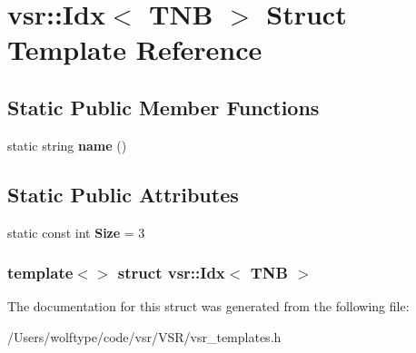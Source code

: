 \hypertarget{structvsr_1_1_idx_3_01_t_n_b_01_4}{\section{vsr\-:\-:Idx$<$ T\-N\-B $>$ Struct Template Reference}
\label{structvsr_1_1_idx_3_01_t_n_b_01_4}
}
\subsection*{Static Public Member Functions}
\begin{DoxyCompactItemize}
\item 
\hypertarget{structvsr_1_1_idx_3_01_t_n_b_01_4_a92c2aade6c3e2844074f988b4cab719a}{static string {\bfseries name} ()}\label{structvsr_1_1_idx_3_01_t_n_b_01_4_a92c2aade6c3e2844074f988b4cab719a}

\end{DoxyCompactItemize}
\subsection*{Static Public Attributes}
\begin{DoxyCompactItemize}
\item 
\hypertarget{structvsr_1_1_idx_3_01_t_n_b_01_4_aabde0fa2d92f746241e21ec84bd20f8b}{static const int {\bfseries Size} = 3}\label{structvsr_1_1_idx_3_01_t_n_b_01_4_aabde0fa2d92f746241e21ec84bd20f8b}

\end{DoxyCompactItemize}
\subsubsection*{template$<$$>$ struct vsr\-::\-Idx$<$ T\-N\-B $>$}



The documentation for this struct was generated from the following file\-:\begin{DoxyCompactItemize}
\item 
/\-Users/wolftype/code/vsr/\-V\-S\-R/vsr\-\_\-templates.\-h\end{DoxyCompactItemize}

